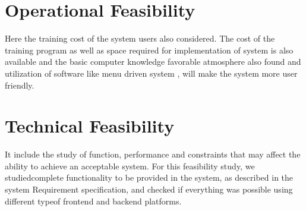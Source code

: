 \section{Operational Feasibility}
Here the training cost of the system users also considered. The cost of the training program as well as space required for implementation of system is also available and the basic computer knowledge favorable atmosphere also found and utilization of software like menu driven system , will make the system more user friendly.


\section{Technical Feasibility}
It include the study of function, performance and constraints that may affect the ability to achieve an acceptable system. For this feasibility study, we studiedcomplete functionality to be provided in the system, as described in the system Requirement specification, and checked if everything was possible using different typeof frontend and backend platforms.
